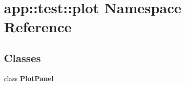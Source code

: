 \section{app::test::plot Namespace Reference}
\label{namespaceapp_1_1test_1_1plot}


\subsection*{Classes}
\begin{CompactItemize}
\item 
class {\bf PlotPanel}
\end{CompactItemize}
